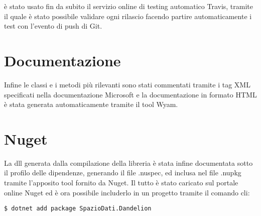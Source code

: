è stato usato fin da subito il servizio online di testing automatico Travis, tramite il quale è stato possibile validare ogni rilascio facendo 
partire automaticamente i test con l'evento di push di Git. 

\section{Documentazione}
Infine le classi e i metodi più rilevanti sono stati commentati tramite i tag XML specificati nella documentazione Microsoft e la documentazione in formato 
HTML è stata generata automaticamente tramite il tool Wyam.

\section{Nuget}
La dll generata dalla compilazione della libreria è stata infine documentata sotto il profilo delle dipendenze, generando il file .nuspec, ed inclusa nel file .nupkg
tramite l'apposito tool fornito da Nuget. Il tutto è stato caricato sul portale online Nuget ed è ora possibile includerlo in un progetto tramite il comando cli:

\begin{lstlisting}[style=TexStyle]
$ dotnet add package SpazioDati.Dandelion
\end{lstlisting}